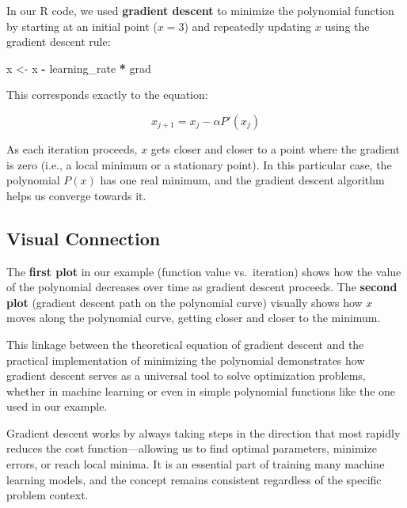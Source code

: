 \documentclass[
  12 pt,
  a4paper,
]{book}
\newenvironment{Shaded}{\begin{snugshade}}{\end{snugshade}}
\newcommand{\NormalTok}[1]{#1}
\newcommand{\OtherTok}[1]{\textcolor[rgb]{0.56,0.35,0.01}{#1}}
\newcommand{\SpecialCharTok}[1]{\textcolor[rgb]{0.81,0.36,0.00}{\textbf{#1}}}
\numberwithin{equation}{section}
\theoremstyle{plain}      %
\theoremstyle{definition} %
\theoremstyle{remark}     %
\theoremstyle{note}         %
\begin{document}
In our R code, we used \textbf{gradient descent} to minimize the
polynomial function by starting at an initial point (\(x = 3\)) and
repeatedly updating \(x\) using the gradient descent rule:

\small

\begin{Shaded}
\begin{Highlighting}[]
\NormalTok{x }\OtherTok{\textless{}{-}}\NormalTok{ x }\SpecialCharTok{{-}}\NormalTok{ learning\_rate }\SpecialCharTok{*}\NormalTok{ grad}
\end{Highlighting}
\end{Shaded}

\normalsize

This corresponds exactly to the equation:

\[
x_{j+1} = x_j - \alpha P'(x_j)
\]

As each iteration proceeds, \(x\) gets closer and closer to a point
where the gradient is zero (i.e., a local minimum or a stationary
point). In this particular case, the polynomial \(P(x)\) has one real
minimum, and the gradient descent algorithm helps us converge towards
it.

\hypertarget{visual-connection}{%
\subsection{Visual Connection}\label{visual-connection}}

The \textbf{first plot} in our example (function value vs.~iteration)
shows how the value of the polynomial decreases over time as gradient
descent proceeds. The \textbf{second plot} (gradient descent path on the
polynomial curve) visually shows how \(x\) moves along the polynomial
curve, getting closer and closer to the minimum.

This linkage between the theoretical equation of gradient descent and
the practical implementation of minimizing the polynomial demonstrates
how gradient descent serves as a universal tool to solve optimization
problems, whether in machine learning or even in simple polynomial
functions like the one used in our example.

Gradient descent works by always taking steps in the direction that most
rapidly reduces the cost function---allowing us to find optimal
parameters, minimize errors, or reach local minima. It is an essential
part of training many machine learning models, and the concept remains
consistent regardless of the specific problem context.
\end{document}
